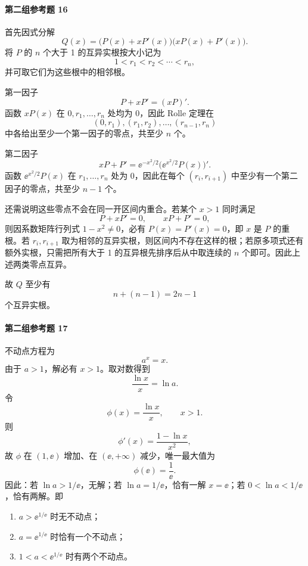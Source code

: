 \paragraph{第二组参考题 16}
\begin{xsolution}
首先因式分解
\[
  Q(x)=\bigl(P(x)+xP'(x)\bigr)\bigl(xP(x)+P'(x)\bigr).
\]
将 $P$ 的 $n$ 个大于 1 的互异实根按大小记为
\[
  1<r_1<r_2<\cdots<r_n,
\]
并可取它们为这些根中的相邻根。

第一因子
\[
  P+xP'=(xP)'.
\]
函数 $xP(x)$ 在 $0,r_1,\ldots,r_n$ 处均为 0，因此 Rolle 定理在
\[
  (0,r_1),(r_1,r_2),\ldots,(r_{n-1},r_n)
\]
中各给出至少一个第一因子的零点，共至少 $n$ 个。

第二因子
\[
  xP+P'=\ee^{-x^2/2}\bigl(\ee^{x^2/2}P(x)\bigr)'.
\]
函数 $\ee^{x^2/2}P(x)$ 在 $r_1,\ldots,r_n$ 处为 0，因此在每个 $(r_i,r_{i+1})$ 中至少有一个第二因子的零点，共至少 $n-1$ 个。

还需说明这些零点不会在同一开区间内重合。若某个 $x>1$ 同时满足
\[
  P+xP'=0,\qquad xP+P'=0,
\]
则因系数矩阵行列式 $1-x^2\ne0$，必有 $P(x)=P'(x)=0$，即 $x$ 是 $P$ 的重根。若 $r_i,r_{i+1}$ 取为相邻的互异实根，则区间内不存在这样的根；若原多项式还有额外实根，只需把所有大于 1 的互异根先排序后从中取连续的 $n$ 个即可。因此上述两类零点互异。

故 $Q$ 至少有
\[
  n+(n-1)=\boxed{2n-1}
\]
个互异实根。
\end{xsolution}

\paragraph{第二组参考题 17}
\begin{xsolution}
不动点方程为
\[
  a^x=x.
\]
由于 $a>1$，解必有 $x>1$。取对数得到
\[
  \frac{\ln x}{x}=\ln a.
\]
令
\[
  \phi(x)=\frac{\ln x}{x},\qquad x>1.
\]
则
\[
  \phi'(x)=\frac{1-\ln x}{x^2},
\]
故 $\phi$ 在 $(1,\ee)$ 增加、在 $(\ee,+\infty)$ 减少，唯一最大值为
\[
  \phi(\ee)=\frac1\ee.
\]
因此：若 $\ln a>1/\ee$，无解；若 $\ln a=1/\ee$，恰有一解 $x=\ee$；若 $0<\ln a<1/\ee$，恰有两解。即
\begin{enumerate}[label=(\arabic*)]
  \item $a>\ee^{1/\ee}$ 时无不动点；
  \item $a=\ee^{1/\ee}$ 时恰有一个不动点；
  \item $1<a<\ee^{1/\ee}$ 时有两个不动点。
\end{enumerate}
\end{xsolution}

